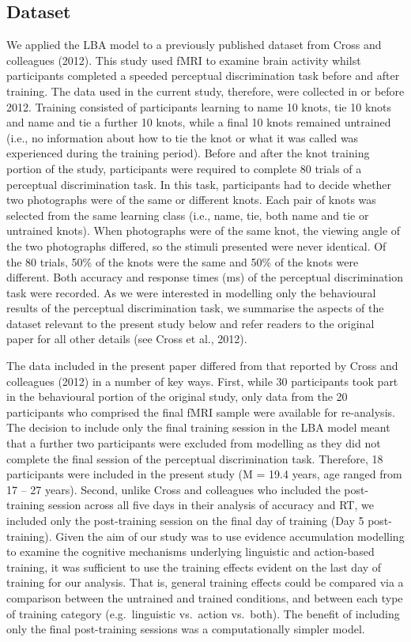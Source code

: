 \documentclass[
  man, donotrepeattitle,floatsintext]{apa6}
\begin{document}
\subsection{Dataset}\label{dataset}

We applied the LBA model to a previously published dataset from Cross and colleagues (2012). This study used fMRI to examine brain activity whilst participants completed a speeded perceptual discrimination task before and after training. The data used in the current study, therefore, were collected in or before 2012. Training consisted of participants learning to name 10 knots, tie 10 knots and name and tie a further 10 knots, while a final 10 knots remained untrained (i.e., no information about how to tie the knot or what it was called was experienced during the training period). Before and after the knot training portion of the study, participants were required to complete 80 trials of a perceptual discrimination task. In this task, participants had to decide whether two photographs were of the same or different knots. Each pair of knots was selected from the same learning class (i.e., name, tie, both name and tie or untrained knots). When photographs were of the same knot, the viewing angle of the two photographs differed, so the stimuli presented were never identical. Of the 80 trials, 50\% of the knots were the same and 50\% of the knots were different. Both accuracy and response times (ms) of the perceptual discrimination task were recorded. As we were interested in modelling only the behavioural results of the perceptual discrimination task, we summarise the aspects of the dataset relevant to the present study below and refer readers to the original paper for all other details (see Cross et al., 2012).

The data included in the present paper differed from that reported by Cross and colleagues (2012) in a number of key ways. First, while 30 participants took part in the behavioural portion of the original study, only data from the 20 participants who comprised the final fMRI sample were available for re-analysis. The decision to include only the final training session in the LBA model meant that a further two participants were excluded from modelling as they did not complete the final session of the perceptual discrimination task. Therefore, 18 participants were included in the present study (M = 19.4 years, age ranged from 17 -- 27 years). Second, unlike Cross and colleagues who included the post-training session across all five days in their analysis of accuracy and RT, we included only the post-training session on the final day of training (Day 5 post-training). Given the aim of our study was to use evidence accumulation modelling to examine the cognitive mechanisms underlying linguistic and action-based training, it was sufficient to use the training effects evident on the last day of training for our analysis. That is, general training effects could be compared via a comparison between the untrained and trained conditions, and between each type of training category (e.g.~linguistic vs.~action vs.~both). The benefit of including only the final post-training sessions was a computationally simpler model.
\end{document}

